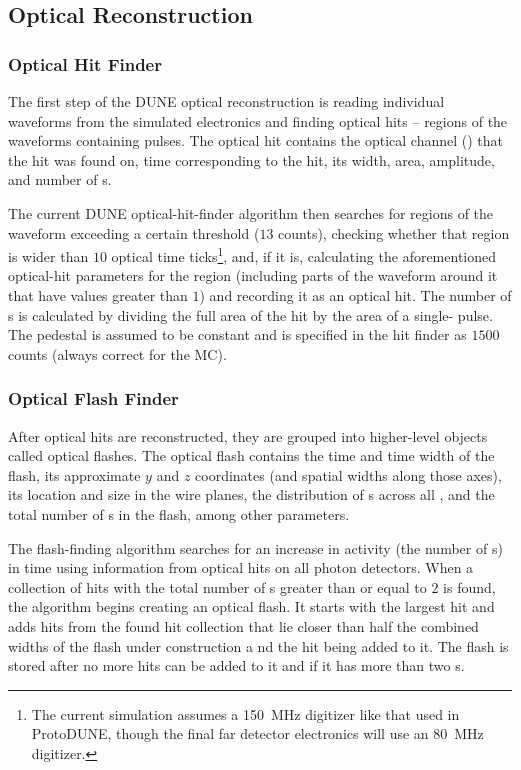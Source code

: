 \subsection{Optical Reconstruction}

\subsubsection{Optical Hit Finder}
\label{sec:OpticalHitFinder}
The first step of the DUNE optical reconstruction is reading
individual waveforms from the simulated  electronics
and finding optical hits -- regions of the waveforms containing pulses.
The optical hit contains the optical channel () that the hit
was found on, time corresponding to the hit, its width,
area, amplitude, and number of \phel{}s.


The current DUNE optical-hit-finder algorithm then searches for regions of the waveform
exceeding a certain threshold ($13$  counts), checking whether that region
is wider than $10$ optical time ticks\footnote{The current simulation assumes a 
\SI{150}{MHz} digitizer like that used in ProtoDUNE, though the final far detector electronics
will use an \SI{80}{MHz} digitizer.}, and, if it is, calculating the aforementioned
optical-hit parameters for the region (including parts of the waveform around it
that have  values greater than $1$) and recording it as an optical hit.
The number of \phel{}s is calculated by dividing the full area of the hit
by the area of a single-\phel{} pulse.
The pedestal is assumed to be constant and is specified in the hit finder as $1500$  counts (always correct for the MC).


\subsubsection{Optical Flash Finder}
After optical hits are reconstructed, they are grouped into higher-level objects called optical flashes.
The optical flash contains the time and time width of the flash,
its approximate $y$ and $z$ coordinates (and spatial widths along those axes),
its location and size in the wire planes,
the distribution of \phel{}s across all ,
and the total number of \phel{}s in the flash, among other parameters.

The flash-finding algorithm searches for an increase in  activity
(the number of \phel{}s) in time using information from optical hits
on all photon detectors.
When a collection of hits with the total number of \phel{}s  
greater than or equal to $2$ is found, the algorithm begins creating an optical flash.
It starts with the largest hit and adds hits from the found hit collection 
that lie closer than half the combined widths of the flash under construction
a nd the hit being added to it.
The flash is stored after no more hits can be added to it
and if it has more than two \phel{}s.

